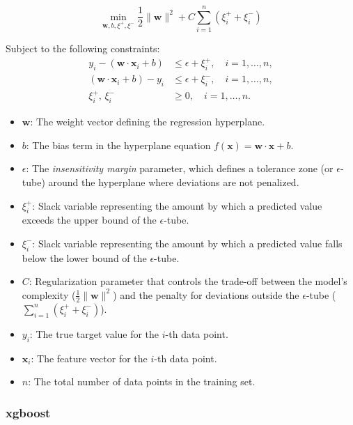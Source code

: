 \begin{equation}
\min_{\mathbf{w}, b, \xi^+, \xi^-} \frac{1}{2} \|\mathbf{w}\|^2 + C \sum_{i=1}^n (\xi_i^+ + \xi_i^-)
\label{eq:svr_cost}
\end{equation}

Subject to the following constraints:
\begin{equation}
\begin{aligned}
y_i - (\mathbf{w} \cdot \mathbf{x}_i + b) &\leq \epsilon + \xi_i^+, \quad i = 1, \dots, n, \\
(\mathbf{w} \cdot \mathbf{x}_i + b) - y_i &\leq \epsilon + \xi_i^-, \quad i = 1, \dots, n, \\
\xi_i^+, \, \xi_i^- &\geq 0, \quad i = 1, \dots, n.
\end{aligned}
\label{eq:svr_constraints}
\end{equation}

\begin{itemize}
    \item \( \mathbf{w} \): The weight vector defining the regression hyperplane.
    \item \( b \): The bias term in the hyperplane equation \( f(\mathbf{x}) = \mathbf{w} \cdot \mathbf{x} + b \).
    \item \( \epsilon \): The \emph{insensitivity margin} parameter, which defines a tolerance zone (or \(\epsilon\)-tube) around the hyperplane where deviations are not penalized.
    \item \( \xi_i^+ \): Slack variable representing the amount by which a predicted value exceeds the upper bound of the \(\epsilon\)-tube.
    \item \( \xi_i^- \): Slack variable representing the amount by which a predicted value falls below the lower bound of the \(\epsilon\)-tube.
    \item \( C \): Regularization parameter that controls the trade-off between the model's complexity (\( \frac{1}{2} \|\mathbf{w}\|^2 \)) and the penalty for deviations outside the \(\epsilon\)-tube (\( \sum_{i=1}^n (\xi_i^+ + \xi_i^-) \)).
    \item \( y_i \): The true target value for the \(i\)-th data point.
    \item \( \mathbf{x}_i \): The feature vector for the \(i\)-th data point.
    \item \( n \): The total number of data points in the training set.
\end{itemize}

\subsubsection{\ac{xgboost}}\label{sec:xgboost}

